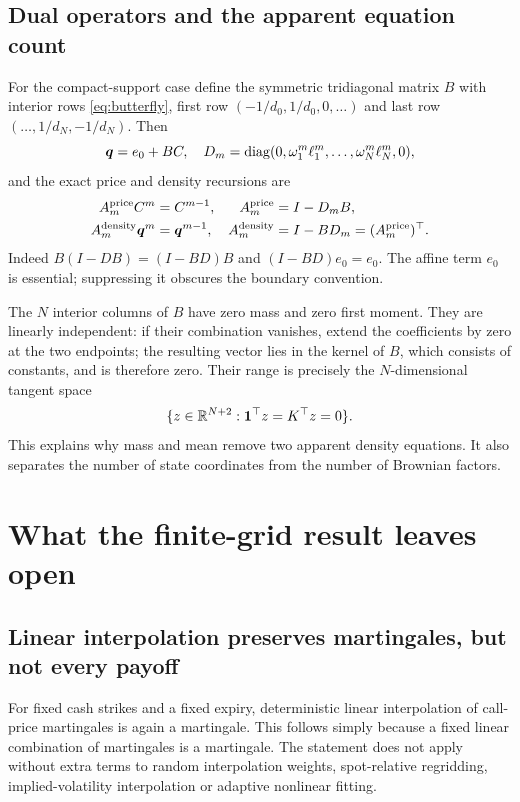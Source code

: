 \documentclass[11pt,a4paper]{article}
\numberwithin{equation}{section}
\theoremstyle{definition}\newtheorem{definition}[theorem]{Definition}
\theoremstyle{remark}\newtheorem{remark}[theorem]{Remark}
\newcommand{\bq}{\boldsymbol q}\newcommand{\cx}{\preceq_{\mathrm{cx}}}
\begin{document}
\subsection{Dual operators and the apparent equation count}
For the compact-support case define the symmetric tridiagonal matrix $B$ with interior rows \eqref{eq:butterfly}, first row $(-1/d_0,1/d_0,0,\ldots)$ and last row $(\ldots,1/d_N,-1/d_N)$. Then
\[
 \bq=e_0+BC,\quad
 D_m=\diag(0,\omega_1^m\ell_1^m,\ldots,\omega_N^m\ell_N^m,0),
\]
and the exact price and density recursions are
\begin{equation}
 \begin{aligned}
 A_m^{\rm price}C^m&=C^{m-1}, & A_m^{\rm price}&=I-D_mB,\\
 A_m^{\rm density}\bq^m&=\bq^{m-1}, &
 A_m^{\rm density}&=I-BD_m=(A_m^{\rm price})^\top.
 \end{aligned}
 \label{eq:dual}
\end{equation}
Indeed $B(I-DB)=(I-BD)B$ and $(I-BD)e_0=e_0$. The affine term $e_0$ is essential; suppressing it obscures the boundary convention.

The $N$ interior columns of $B$ have zero mass and zero first moment. They are linearly independent: if their combination vanishes, extend the coefficients by zero at the two endpoints; the resulting vector lies in the kernel of $B$, which consists of constants, and is therefore zero. Their range is precisely the $N$-dimensional tangent space
\[
 \{z\in\mathbb R^{N+2}:\boldsymbol1^\top z=K^\top z=0\}.
\]
This explains why mass and mean remove two apparent density equations. It also separates the number of state coordinates from the number of Brownian factors.

\section{What the finite-grid result leaves open}
\label{sec:gaps}
\subsection{Linear interpolation preserves martingales, but not every payoff}
For fixed cash strikes and a fixed expiry, deterministic linear interpolation of call-price martingales is again a martingale. This follows simply because a fixed linear combination of martingales is a martingale. The statement does not apply without extra terms to random interpolation weights, spot-relative regridding, implied-volatility interpolation or adaptive nonlinear fitting.
\end{document}
